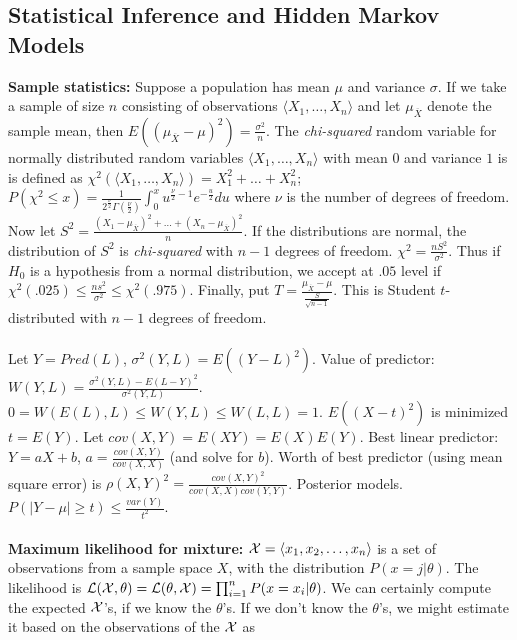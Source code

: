 \subsection {Statistical Inference and Hidden Markov Models}
{\bf Sample statistics:} Suppose a population has mean $\mu$ and variance $\sigma$. 
If we
take a sample of size $n$ consisting of observations $\langle X_1 , \ldots , X_n \rangle$ and
let $\mu_{\overline X}$ denote the sample mean, then 
$E((\mu_{\overline X} - \mu)^2) = {\frac {\sigma^2} n}$.  
The \emph{chi-squared}
random variable for normally distributed random variables $\langle X_1, \ldots , X_n \rangle$
with mean $0$ and variance $1$ is
is defined as $\chi^2(\langle X_1, \ldots , X_n \rangle )= X_1^2 + \ldots + X_n^2$;
$P(\chi^2 \leq x) = {\frac {1} {2^{\frac {\nu} {2}} \Gamma({\frac {\nu} {2}})}} \int_0^x u^{{\frac {\nu} {2}} -1} e^{-{\frac {u} {2}}} du$ where $\nu$ is the number of degrees of freedom.
Now let $S^2= {\frac {(X_1 - \mu_{\overline X})^2 + \ldots + (X_n - \mu_{\overline X})^2} {n}}$.
If the distributions are normal, the distribution of $S^2$ is \emph{chi-squared} with $n-1$
degrees of freedom. 
$\chi^2= {\frac {nS^2} {\sigma^2}}$.  Thus if $H_0$ is a hypothesis from a normal distribution,
we accept at $.05$ level if $\chi^2(.025) \leq {\frac {n s^2} {\sigma^2}} \leq \chi^2(.975)$.
Finally, put $T= {\frac {\mu_{\overline X} - \mu} {{\frac {S} {\sqrt {n-1}}}}}$.  This is
Student $t$-distributed with $n-1$ degrees of freedom.
\\
\\
Let $Y=Pred(L)$, $\sigma^2(Y,L)= E((Y-L)^2)$.  Value of predictor:
$W(Y,L)= {\frac {\sigma^2(Y,L) -E(L-Y)^2} {\sigma^2(Y,L)}}$. 
$0=W(E(L),L) \le W(Y,L) \le W(L,L)=1$.  $E((X-t)^2)$ is minimized $t=E(Y)$.
Let $cov(X,Y)= E(XY)=E(X)E(Y)$.
Best linear predictor: $Y=aX+b$, $a= {\frac {cov(X,Y)} {cov(X,X)}}$ (and solve for $b$).
Worth of best predictor (using mean square error) is
$\rho(X,Y)^2= {\frac {cov(X,Y)^2} {cov(X,X) cov(Y,Y)}}$.  Posterior models.
$P(|Y- \mu| \ge t) \le {\frac {var(Y)} {t^2}}$.
\\
\\
{\bf Maximum likelihood for mixture:}
${\cal X} = \langle x_1 , x_2 , \ldots, x_n \rangle$ is a set of observations from
a sample space $X$, with the distribution $P(x=j | \theta)$.
The likelihood is ${\cal L}({\cal X}, \theta) = {\cal L}(\theta, {\cal X}) = \prod_{i=1}^n P(x=x_i | \theta)$.
We can certainly compute the expected ${\cal X}$'s, if we know the $\theta$'s.
If we don't know the $\theta$'s, we might estimate it based on the observations of the ${\cal X}$ as
